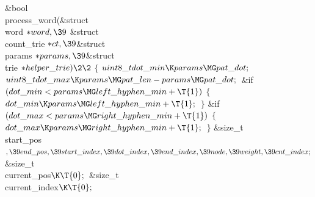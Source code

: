 \Y\B\1\1\&{bool} \\{process\_word}(\&{struct} \\{word} ${}{*}\\{word},\39{}$%
\&{struct} \\{count\_trie} ${}{*}\\{ct},\39{}$\&{struct} \\{params} ${}{*}%
\\{params},\39{}$\&{struct} \\{trie} ${}{*}\\{helper\_trie})\2\2{}$\6
${}\{{}$\1\6
${}\\{uint8\_t}\\{dot\_min}\K\\{params}\MG\\{pat\_dot};{}$\6
${}\\{uint8\_t}\\{dot\_max}\K\\{params}\MG\\{pat\_len}-\\{params}\MG\\{pat%
\_dot};{}$\6
\&{if} ${}(\\{dot\_min}<\\{params}\MG\\{left\_hyphen\_min}+\T{1}){}$\5
${}\{{}$\1\6
${}\\{dot\_min}\K\\{params}\MG\\{left\_hyphen\_min}+\T{1};{}$\6
\4${}\}{}$\2\6
\&{if} ${}(\\{dot\_max}<\\{params}\MG\\{right\_hyphen\_min}+\T{1}){}$\5
${}\{{}$\1\6
${}\\{dot\_max}\K\\{params}\MG\\{right\_hyphen\_min}+\T{1};{}$\6
\4${}\}{}$\2\7
\&{size\_t} \\{start\_pos}${},\39\\{end\_pos},\39\\{start\_index},\39\\{dot%
\_index},\39\\{end\_index},\39\\{node},\39\\{weight},\39\\{cnt\_index};{}$\6
\&{size\_t} \\{current\_pos}${}\K\T{0};{}$\6
\&{size\_t} \\{current\_index}${}\K\T{0};{}$\6
